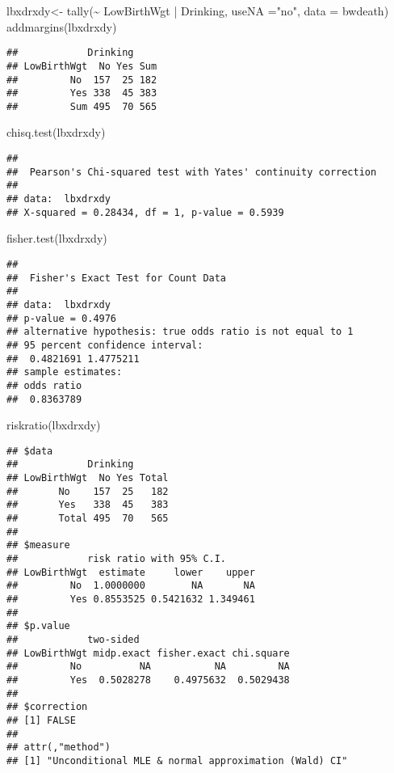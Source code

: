 \documentclass[
]{article}
\newenvironment{Shaded}{\begin{snugshade}}{\end{snugshade}}
\newcommand{\AttributeTok}[1]{\textcolor[rgb]{0.77,0.63,0.00}{#1}}
\newcommand{\FunctionTok}[1]{\textcolor[rgb]{0.00,0.00,0.00}{#1}}
\newcommand{\NormalTok}[1]{#1}
\newcommand{\OtherTok}[1]{\textcolor[rgb]{0.56,0.35,0.01}{#1}}
\newcommand{\SpecialCharTok}[1]{\textcolor[rgb]{0.00,0.00,0.00}{#1}}
\newcommand{\StringTok}[1]{\textcolor[rgb]{0.31,0.60,0.02}{#1}}
\begin{document}
\begin{Shaded}
\begin{Highlighting}[]
\NormalTok{lbxdrxdy}\OtherTok{\textless{}{-}} \FunctionTok{tally}\NormalTok{(}\SpecialCharTok{\textasciitilde{}}\NormalTok{ LowBirthWgt }\SpecialCharTok{|}\NormalTok{ Drinking, }\AttributeTok{useNA =}\StringTok{"no"}\NormalTok{, }\AttributeTok{data =}\NormalTok{ bwdeath)}
\FunctionTok{addmargins}\NormalTok{(lbxdrxdy)}
\end{Highlighting}
\end{Shaded}

\begin{verbatim}
##            Drinking
## LowBirthWgt  No Yes Sum
##         No  157  25 182
##         Yes 338  45 383
##         Sum 495  70 565
\end{verbatim}

\begin{Shaded}
\begin{Highlighting}[]
\FunctionTok{chisq.test}\NormalTok{(lbxdrxdy)}
\end{Highlighting}
\end{Shaded}

\begin{verbatim}
## 
##  Pearson's Chi-squared test with Yates' continuity correction
## 
## data:  lbxdrxdy
## X-squared = 0.28434, df = 1, p-value = 0.5939
\end{verbatim}

\begin{Shaded}
\begin{Highlighting}[]
\FunctionTok{fisher.test}\NormalTok{(lbxdrxdy)}
\end{Highlighting}
\end{Shaded}

\begin{verbatim}
## 
##  Fisher's Exact Test for Count Data
## 
## data:  lbxdrxdy
## p-value = 0.4976
## alternative hypothesis: true odds ratio is not equal to 1
## 95 percent confidence interval:
##  0.4821691 1.4775211
## sample estimates:
## odds ratio 
##  0.8363789
\end{verbatim}

\begin{Shaded}
\begin{Highlighting}[]
\FunctionTok{riskratio}\NormalTok{(lbxdrxdy)}
\end{Highlighting}
\end{Shaded}

\begin{verbatim}
## $data
##            Drinking
## LowBirthWgt  No Yes Total
##       No    157  25   182
##       Yes   338  45   383
##       Total 495  70   565
## 
## $measure
##            risk ratio with 95% C.I.
## LowBirthWgt  estimate     lower    upper
##         No  1.0000000        NA       NA
##         Yes 0.8553525 0.5421632 1.349461
## 
## $p.value
##            two-sided
## LowBirthWgt midp.exact fisher.exact chi.square
##         No          NA           NA         NA
##         Yes  0.5028278    0.4975632  0.5029438
## 
## $correction
## [1] FALSE
## 
## attr(,"method")
## [1] "Unconditional MLE & normal approximation (Wald) CI"
\end{verbatim}
\end{document}
